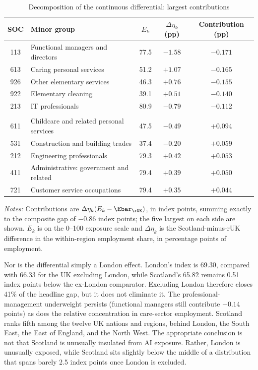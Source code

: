 \begin{table}[t]
\centering
\caption{Decomposition of the continuous differential: largest contributions}
\label{tab:decomposition}
\small
\begin{tabular}{clccc}
\toprule
SOC & Minor group & $E_k$ & $\Delta\eta_k$ (pp) & Contribution (pp) \\
\midrule
113 & Functional managers and directors        & 77.5 & $-1.58$ & $-0.171$ \\
613 & Caring personal services                 & 51.2 & $+1.07$ & $-0.165$ \\
926 & Other elementary services                & 46.3 & $+0.76$ & $-0.155$ \\
922 & Elementary cleaning                      & 39.1 & $+0.51$ & $-0.140$ \\
213 & IT professionals                         & 80.9 & $-0.79$ & $-0.112$ \\
\\
611 & Childcare and related personal services  & 47.5 & $-0.49$ & $+0.094$ \\
531 & Construction and building trades         & 37.4 & $-0.20$ & $+0.059$ \\
212 & Engineering professionals                & 79.3 & $+0.42$ & $+0.053$ \\
411 & Administrative: government and related   & 79.4 & $+0.39$ & $+0.050$ \\
721 & Customer service occupations             & 79.4 & $+0.35$ & $+0.044$ \\
\bottomrule
\end{tabular}
\begin{minipage}{0.92\textwidth}
\vspace{0.4em}\footnotesize
\textit{Notes:} Contributions are $\Delta\eta_k (E_k - \Ebar_{\rUK})$, in index points, summing exactly to the composite gap of $-0.86$ index points; the five largest on each side are shown. $E_k$ is on the 0--100 exposure scale and $\Delta\eta_k$ is the Scotland-minus-rUK difference in the within-region employment share, in percentage points of employment.
\end{minipage}
\end{table}
 
Nor is the differential simply a London effect. London's index is 69.30, compared with 66.33 for the UK excluding London, while Scotland's 65.82 remains 0.51 index points below the ex-London comparator. Excluding London therefore closes 41\% of the headline gap, but it does not eliminate it. The professional-management underweight persists (functional managers still contribute $-0.14$ points) as does the relative concentration in care-sector employment. Scotland ranks fifth among the twelve UK nations and regions, behind London, the South East, the East of England, and the North West. The appropriate conclusion is not that Scotland is unusually insulated from AI exposure. Rather, London is unusually exposed, while Scotland sits slightly below the middle of a distribution that spans barely 2.5 index points once London is excluded.
 
